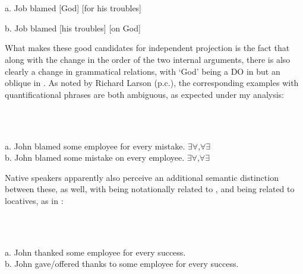 \documentclass[output=paper,modfonts, nonflat]{langsci/langscibook}
\begin{document}
\begin{styleinnerExample}
\begin{styleinnerExample}
\ea%
    \label{ex:key:56}
    \gll\\
        \\
    \glt
    \z

           a.  Job blamed [God] [for his troubles]   \citep{Larson1990}
\end{styleinnerExample}

\begin{styleinnerExample}
  b.  Job blamed [his troubles] [on God]
\end{styleinnerExample}

What makes these good candidates for independent projection is the fact that along with the change in the order of the two internal arguments, there is also clearly a change in grammatical relations, with ‘God’ being a DO in  but an oblique in . As noted by Richard Larson (p.c.), the corresponding examples with quantificational phrases are both ambiguous, as expected under my analysis:

\begin{styleinnerExample}
\ea%
    \label{ex:key:57}
    \gll\\
        \\
    \glt
    \z

           a.  John blamed some employee for every mistake.   ${\exists}{\forall}$,${\forall}{\exists}$  \\
b.   John blamed some mistake on every employee.   ${\exists}{\forall}$,${\forall}{\exists}$\\\end{styleinnerExample}

Native speakers apparently also perceive an additional semantic distinction between these, as well, with  being notationally related to , and  being related to locatives, as in :

\begin{styleinnerExample}
\ea%
    \label{ex:key:58}
    \gll\\
        \\
    \glt
    \z

          a.  John thanked some employee for every success.\\
b.  John gave/offered thanks to some employee for every success.
\end{styleinnerExample}


\end{styleinnerExample}
\end{document}
